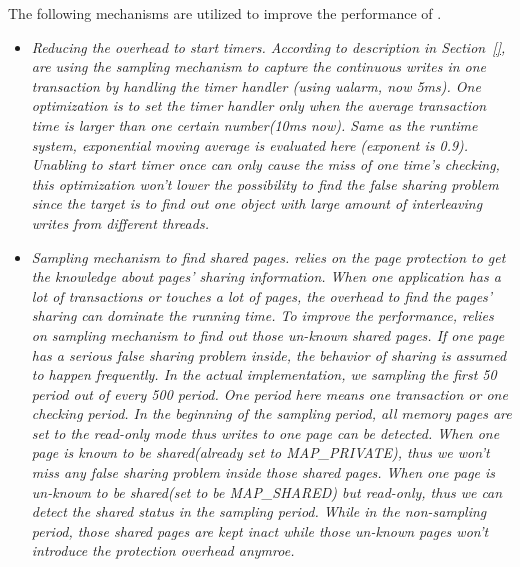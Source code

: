 The following mechanisms are utilized to improve the performance of \DETECTIVE{}.
\begin{itemize}
\item
\em{Reducing the overhead to start timers}. According to description in Section~\ref{}, \DETECTIVE{} are using the sampling mechanism to capture the continuous writes in one transaction by handling the timer handler (using ualarm, now 5ms). 
One optimization is to set the timer handler only when the average transaction time is larger than one certain number(10ms now). Same as the \PATROL{} runtime system, exponential moving average is evaluated here (exponent is 0.9). 
Unabling to start timer once can only cause the miss of one time's checking, this optimization won't lower the possibility to find the false sharing problem since the target is to find out one object with large amount of interleaving writes from different threads.
 
\item
\em{Sampling mechanism to find shared pages}. \DETECTIVE{} relies on the page protection to get the knowledge about pages' sharing information. When one application has a lot of transactions or touches a lot of pages, the overhead to find the pages' sharing can  dominate the running time. To improve the performance, \DETECTIVE{} relies on sampling mechanism to find out those un-known shared pages. If one page has a serious false sharing problem inside, the behavior of sharing is assumed to happen frequently. 
In the actual implementation, we sampling the first 50 period out of every 500 period. 
One period here means one transaction or one checking period. 
In the beginning of the sampling period, all memory pages are set to the read-only mode thus writes to one page can be detected. 
When one page is known to be shared(already set to MAP_PRIVATE), thus we won't miss any false sharing problem inside those shared pages. 
When one page is un-known to be shared(set to be MAP_SHARED) but read-only, thus we can detect the shared status in the sampling period. 
While in the non-sampling period, those shared pages are kept inact while those un-known pages won't introduce the protection overhead anymroe. 

\end{itemize}


